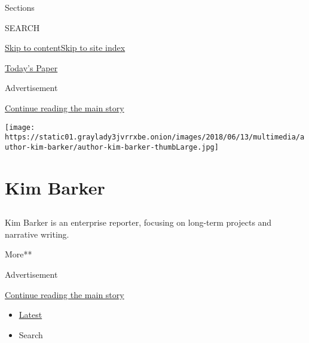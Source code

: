 Sections

SEARCH

\protect\hyperlink{site-content}{Skip to
content}\protect\hyperlink{site-index}{Skip to site index}

\href{https://myaccount.nytimes3xbfgragh.onion/auth/login?response_type=cookie\&client_id=vi}{}

\href{https://www.nytimes3xbfgragh.onion/section/todayspaper}{Today's
Paper}

Advertisement

\protect\hyperlink{after-top}{Continue reading the main story}

\texttt{[image: https://static01.graylady3jvrrxbe.onion/images/2018/06/13/multimedia/author-kim-barker/author-kim-barker-thumbLarge.jpg]}

\hypertarget{kim-barker}{%
\section{Kim Barker}\label{kim-barker}}

\subsection{}

Kim Barker is an enterprise reporter, focusing on long-term projects and
narrative writing.

More**

Advertisement

\protect\hyperlink{after-mid1}{Continue reading the main story}

\begin{itemize}
\tightlist
\item
  \protect\hyperlink{stream-panel}{Latest}
\item
  Search
\end{itemize}


